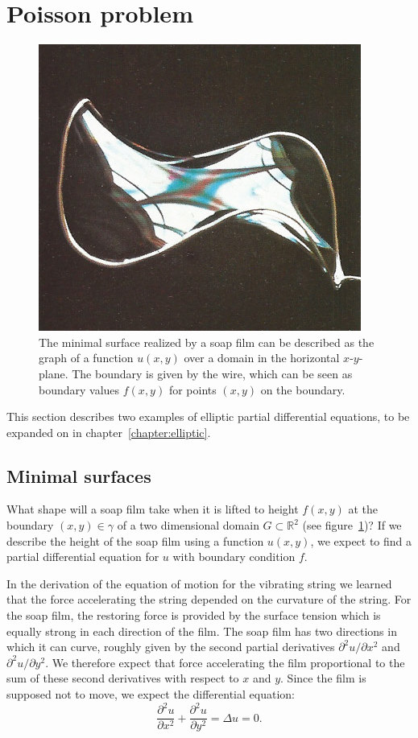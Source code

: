 %
%
%
\section{Poisson problem}
\label{poisson-problem}
\begin{figure}
\centering
\includegraphics[width=0.4\hsize]{1-examples/images/minimum-area-surface.jpg}
\caption{The minimal surface realized by a soap film can be described as
the graph of a function $u(x,y)$ over a domain in the horizontal $x$-$y$-plane.
The boundary is given by the wire, which can be seen as boundary values
$f(x,y)$ for points $(x,y)$ on the boundary.
\label{examples:minimal-surface-image}}
\end{figure}
This section describes two examples of elliptic partial differential
equations, to be expanded on in chapter~\ref{chapter:elliptic}.

\subsection{Minimal surfaces\label{beispiele:minimal surfaces}}
What shape will a soap film take when it is lifted to height
$f(x,y)$ at the boundary $(x,y)\in\gamma$ of 
a two dimensional domain $G\subset \mathbb R^2$
(see figure~\ref{examples:minimal-surface-image})?
If we describe the height of the soap film using a function
$u(x,y)$, we expect to find a partial differential equation for $u$
with boundary condition $f$.

In the derivation of the equation of motion for the vibrating string
we learned that the force accelerating the string depended on the
curvature of the string.
For the soap film, the restoring force is provided by the surface
tension which is equally strong in each direction of the film.
The soap film has two directions in which it can curve, roughly
given by the second partial derivatives $\partial^2 u/\partial x^2$ and
$\partial^2 u/\partial y^2$.
We therefore expect that force accelerating the film proportional
to the sum of these second derivatives with respect to $x$ and $y$.
Since the film is supposed not to move, we expect the differential
equation:
\[
\frac{\partial^2 u }{\partial x^2}+\frac{\partial^2 u }{\partial y^2}
=\Delta u =0.
\]

